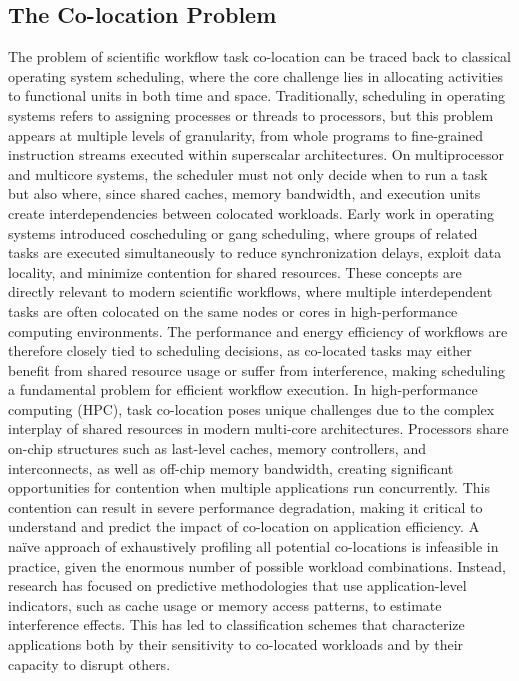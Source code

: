 \subsection{The Co-location Problem}
\label{sec:background_colocation}
The problem of scientific workflow task co-location can be traced back to classical operating system scheduling, where the core challenge lies in allocating activities to functional units in both time and space. Traditionally, scheduling in operating systems refers to assigning processes or threads to processors, but this problem appears at multiple levels of granularity, from whole programs to fine-grained instruction streams executed within superscalar architectures. On multiprocessor and multicore systems, the scheduler must not only decide when to run a task but also where, since shared caches, memory bandwidth, and execution units create interdependencies between colocated workloads. Early work in operating systems introduced coscheduling or gang scheduling, where groups of related tasks are executed simultaneously to reduce synchronization delays, exploit data locality, and minimize contention for shared resources. These concepts are directly relevant to modern scientific workflows, where multiple interdependent tasks are often colocated on the same nodes or cores in high-performance computing environments. The performance and energy efficiency of workflows are therefore closely tied to scheduling decisions, as co-located tasks may either benefit from shared resource usage or suffer from interference, making scheduling a fundamental problem for efficient workflow execution.
In high-performance computing (HPC), task co-location poses unique challenges due to the complex interplay of shared resources in modern multi-core architectures. Processors share on-chip structures such as last-level caches, memory controllers, and interconnects, as well as off-chip memory bandwidth, creating significant opportunities for contention when multiple applications run concurrently. This contention can result in severe performance degradation, making it critical to understand and predict the impact of co-location on application efficiency. A naïve approach of exhaustively profiling all potential co-locations is infeasible in practice, given the enormous number of possible workload combinations. Instead, research has focused on predictive methodologies that use application-level indicators, such as cache usage or memory access patterns, to estimate interference effects. This has led to classification schemes that characterize applications both by their sensitivity to co-located workloads and by their capacity to disrupt others. 
